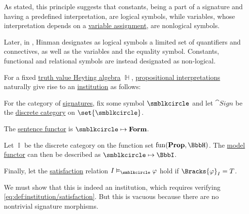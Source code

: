 \begin{remark}
\begin{itemize}
    As stated, this principle suggests that constants, being a part of a signature and having a predefined interpretation, are logical symbols, while variables, whose interpretation depends on a \hyperref[def:first_order_valuation/variable_assignment]{variable assignment}, are nonlogical symbols.

    Later, in \cite[def. 2.1.2]{Hinman2005Logic}, Hinman designates as logical symbols a limited set of quantifiers and connectives, as well as the variables and the equality symbol. Constants, functional and relational symbols are instead designated as non-logical.
  \end{itemize}
\end{remark}

\begin{definition}\label{def:propositional_institution}\mimprovised
  For a fixed \hyperref[con:truth_value_algebra]{truth value Heyting algebra} \( \BbbH \), \hyperref[def:propositional_valuation/interpretation]{propositional interpretations} naturally give rise to an \hyperref[def:institution]{institution} as follows:
  \begin{thmenum}
     For the category of \hyperref[def:institution/signatures]{signatures}, fix some symbol \( \anon \) and let \( \cat{Sign} \) be the \hyperref[def:discrete_category]{discrete category} on \( \set{ \anon } \).

     The \hyperref[def:institution/sentences]{sentence functor} is \( \anon \mapsto \op*{Form} \).

     Let \( \BbbI \) be the discrete category on the function set \( \fun(\op*{Prop}, \BbbH) \). The \hyperref[def:institution/models]{model functor} can then be described as \( \anon \mapsto \BbbI \).

     Finally, let the \hyperref[def:institution/satisfaction]{satisfaction} relation \( I \vDash_{\anon} \varphi \) hold if \( \Bracks{\varphi}_I = T \).
  \end{thmenum}
\end{definition}
\begin{defproof}
  We must show that this is indeed an institution, which requires verifying \eqref{eq:def:institution/satisfaction}. But this is vacuous because there are no nontrivial signature morphisms.
\end{defproof}

